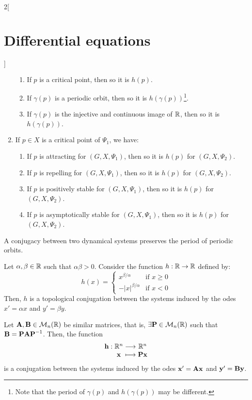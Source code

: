 \documentclass[../../../main_math.tex]{subfiles}
\begin{document}
\begin{multicols}{2}[\section{Differential equations}]
\begin{proposition}
\begin{enumerate}
            \begin{enumerate}
              \item If $p$ is a critical point, then so it is $h(p)$.
              \item If $\gamma(p)$ is a periodic orbit, then so it is $h(\gamma(p))$\footnote{Note that the period of $\gamma(p)$ and $h(\gamma(p))$ may be different.}.
              \item If $\gamma(p)$ is the injective and continuous image of $\mathbb{R}$, then so it is $h(\gamma(p))$.
            \end{enumerate}
      \item If $p\in X$ is a critical point of $\Psi_1$, we have:
            \begin{enumerate}
              \item If $p$ is attracting for $(G,X,\Psi_1)$, then so it is $h(p)$ for $(G,X,\Psi_2)$.
              \item If $p$ is repelling for $(G,X,\Psi_1)$, then so it is $h(p)$ for $(G,X,\Psi_2)$.
              \item If $p$ is positively stable for $(G,X,\Psi_1)$, then so it is $h(p)$ for $(G,X,\Psi_2)$.
              \item If $p$ is asymptotically stable for $(G,X,\Psi_1)$, then so it is $h(p)$ for $(G,X,\Psi_2)$.
            \end{enumerate}
    \end{enumerate}
  \end{proposition}
  \begin{proposition}
    A conjugacy between two dynamical systems preserves the period of periodic orbits.
  \end{proposition}
  \begin{proposition}
    Let $\alpha,\beta\in\mathbb{R}$ such that $\alpha\beta>0$. Consider the function $h:\mathbb{R}\rightarrow\mathbb{R}$ defined by: $$h(x)=
      \begin{cases}
        x^{\beta/\alpha}      & \text{if }x\geq 0 \\
        -{|x|}^{\beta/\alpha} & \text{if }x< 0
      \end{cases}$$
    Then, $h$ is a topological conjugation between the systems induced by the odes $x'=\alpha x$ and $y'=\beta y$.
  \end{proposition}
  \begin{proposition}
    Let $\boldsymbol{\mathrm{A}},\boldsymbol{\mathrm{B}}\in\mathcal{M}_n(\mathbb{R})$ be similar matrices, that is, $\exists\boldsymbol{\mathrm{P}}\in\mathcal{M}_n(\mathbb{R})$ such that $\boldsymbol{\mathrm{B}}=\boldsymbol{\mathrm{P}}\boldsymbol{\mathrm{A}}\boldsymbol{\mathrm{P}}^{-1}$. Then, the function $$\function{\vf{h}}{\RR^n}{\RR^n}{\vf{x}}{\vf{Px}}$$ is a conjugation between the systems induced by the odes $\boldsymbol{\mathrm{x}}'=\boldsymbol{\mathrm{A}}\boldsymbol{\mathrm{x}}$ and $\boldsymbol{\mathrm{y}}'=\boldsymbol{\mathrm{B}}\boldsymbol{\mathrm{y}}$.
  \end{proposition}

\end{multicols}
\end{document}
